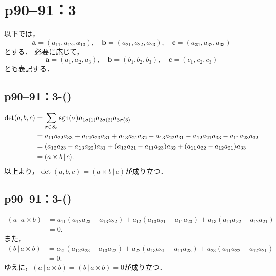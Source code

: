 \section*{p90--91：3} \label{p90--91：3}

以下では，
\[
  \bm{a}=(a_{11},a_{12},a_{13}),\quad \bm{b}=(a_{21},a_{22},a_{23}),\quad \bm{c}=(a_{31},a_{32},a_{33})
\]とする．
必要に応じて，
\[
  \bm{a}=(a_1,a_2,a_3),\quad \bm{b}=(b_1,b_2,b_3) ,\quad \bm{c}=(c_1,c_2,c_3)
\]
とも表記する．

\subsection*{p90--91：3-()} \label{p90--91：3-(\romannumeral1)}

\begin{tproof}
  \begin{align*}
    \det (a,b,c) & = \sum_{\sigma \in S_3} \operatorname{sgn}(\sigma) a_{1\sigma(1)} a_{2\sigma(2)} a_{3\sigma(3)}                                                         \\
                 & = a_{11} a_{22} a_{33} + a_{12} a_{23} a_{31} + a_{13} a_{21} a_{32} - a_{13} a_{22} a_{31} - a_{12} a_{21} a_{33} - a_{11} a_{23} a_{32} \\
                 & = (a_{12} a_{23}-a_{13} a_{22})  a_{31} + (a_{13} a_{21}-a_{11} a_{23}) a_{32} + (a_{11} a_{22}-a_{12} a_{21}) a_{33}                     \\
                 & = (a \times b \, | \,  c).
  \end{align*}
  以上より，$\det (a,b,c) = (a \times b \, | \,  c)$が成り立つ．
\end{tproof}

\subsection*{p90--91：3-()} \label{p90--91：3-(\romannumeral2)}

\begin{tproof}
  \begin{align*}
    (a \, | \, a \times b) & = a_{11} (a_{12} a_{23}-a_{13} a_{22})+ a_{12} (a_{13} a_{21}-a_{11} a_{23}) + a_{13} (a_{11} a_{22}-a_{12} a_{21}) \\
                           & =0.
  \end{align*}
  また，
  \begin{align*}
    (b\, | \, a \times b) & = a_{21} (a_{12} a_{23}-a_{13} a_{22})+ a_{22} (a_{13} a_{21}-a_{11} a_{23}) + a_{23} (a_{11} a_{22}-a_{12} a_{21}) \\
                          & =0.
  \end{align*}
  ゆえに，$(a \, | \, a \times b) = (b \, | \, a \times b) = 0$が成り立つ．
\end{tproof}

